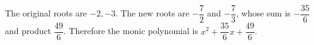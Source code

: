 The original roots are $-2,-3$. The new roots are $-\dfrac{7}{2}$ and $-\dfrac{7}{3}$, whose sum is $-\dfrac{35}{6}$ and product $\dfrac{49}{6}$. Therefore the monic polynomial is $\boxed{x^2+\dfrac{35}{6}x+\dfrac{49}{6}}$.
